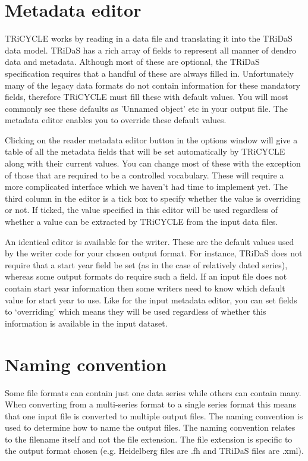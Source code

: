\documentclass[10pt, headsepline,DIV14,BCOR0.5cm]{scrreprt}
\begin{document}
\section{Metadata editor}

TRiCYCLE works by reading in a data file and translating it into the TRiDaS data model. TRiDaS has
a rich array of fields to represent all manner of dendro data and metadata. Although most of these are
optional, the TRiDaS specification requires that a handful of these are always filled in. Unfortunately many
of the legacy data formats do not contain information for these mandatory fields, therefore TRiCYCLE
must fill these with default values. You will most commonly see these defaults as 'Unnamed object' etc in
your output file. The metadata editor enables you to override these default values.

Clicking on the reader metadata editor button in the options window will give a table of all the metadata
fields that will be set automatically by TRiCYCLE along with their current values. You can change most
of these with the exception of those that are required to be a controlled vocabulary. These will require a 
more complicated interface which we haven't had time to implement yet. The third column in the editor is
a tick box to specify whether the value is overriding or not. If ticked, the value specified in this editor will
be used regardless of whether a value can be extracted by TRiCYCLE from the input data files.

An identical editor is available for the writer. These are the default values used by the writer code for
your chosen output format. For instance, TRiDaS does not require that a start year field be set (as in the
case of relatively dated series), whereas some output formats do require such a field. If an input file does
not contain start year information then some writers need to know which default value for start year to
use. Like for the input metadata editor, you can set fields to `overriding' which means they will be used
regardless of whether this information is available in the input dataset.

\section{Naming convention}

Some file formats can contain just one data series while others can contain many. When converting from
a multi-series format to a single series format this means that one input file is converted to multiple output
files. The naming convention is used to determine how to name the output files. The naming convention
relates to the filename itself and not the file extension. The file extension is specific to the output format
chosen (e.g. Heidelberg files are .fh and TRiDaS files are .xml).
\end{document}
